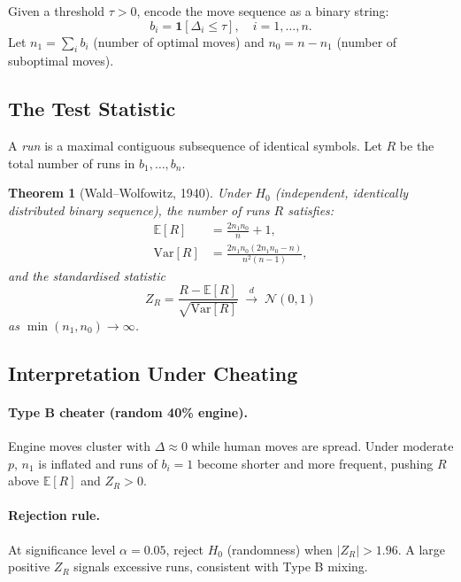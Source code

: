 \documentclass[11pt,a4paper]{article}
\newtheorem{theorem}{Theorem}
\begin{document}
Given a threshold $\tau > 0$, encode the move sequence as a binary string:
\begin{equation}
  b_i = \mathbf{1}[\Delta_i \leq \tau], \quad i = 1, \ldots, n.
\end{equation}
Let $n_1 = \sum_{i} b_i$ (number of optimal moves) and
$n_0 = n - n_1$ (number of suboptimal moves).

\subsection{The Test Statistic}

A \emph{run} is a maximal contiguous subsequence of identical symbols.
Let $R$ be the total number of runs in $b_1, \ldots, b_n$.

\begin{theorem}[Wald--Wolfowitz, 1940]
Under $H_0$ (independent, identically distributed binary sequence), the
number of runs $R$ satisfies:
\begin{align}
  \mathbb{E}[R] &= \frac{2 n_1 n_0}{n} + 1, \label{eq:ER} \\
  \mathrm{Var}[R] &= \frac{2 n_1 n_0 (2 n_1 n_0 - n)}{n^2 (n-1)},
  \label{eq:VarR}
\end{align}
and the standardised statistic
\begin{equation}
  Z_R = \frac{R - \mathbb{E}[R]}{\sqrt{\mathrm{Var}[R]}}
  \;\xrightarrow{d}\; \mathcal{N}(0,1)
  \label{eq:ZR}
\end{equation}
as $\min(n_1, n_0) \to \infty$.
\end{theorem}

\subsection{Interpretation Under Cheating}

\paragraph{Type B cheater (random 40\% engine).}
Engine moves cluster with $\Delta \approx 0$ while human moves are spread.
Under moderate $p$, $n_1$ is inflated and runs of $b_i = 1$ become shorter
and more frequent, pushing $R$ above $\mathbb{E}[R]$ and $Z_R > 0$.

\paragraph{Rejection rule.}
At significance level $\alpha = 0.05$, reject $H_0$ (randomness) when
$|Z_R| > 1.96$. A large positive $Z_R$ signals excessive runs, consistent
with Type B mixing.
\end{document}
